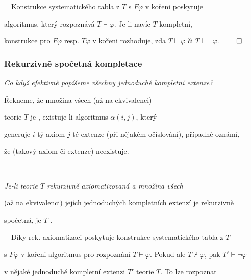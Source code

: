     {\it {}}\ \ Konstrukce systematického tabla z $T$ s $F\varphi$ v kořeni poskytuje
    \smallskip
    
    algoritmus, který rozpoznává $T\vdash\varphi$. Je-li navíc $T$ kompletní, 
    \smallskip
    
    konstrukce pro $F\varphi$ resp. $T\varphi$ v kořeni rozhoduje, zda $T \vdash \varphi$ či $T \vdash \neg\varphi$. $\qed$
    
    
    
    \subsubsection*{Rekurzivně spočetná kompletace}
    {\it Co když efektivně popíšeme všechny jednoduché kompletní extenze?}
    \medskip
    
    \smallskip
    
    Řekneme, že množina všech (až na ekvivalenci) 
    \smallskip
    
     teorie $T$ je , existuje-li algoritmus $\alpha(i,j)$, který
    \smallskip
    
    generuje $i$-tý axiom $j$-té extenze (při nějakém očíslování), případně oznámí,
    \smallskip
    
    že (takový axiom či extenze) neexistuje.
    \medskip
    
    \smallskip
    
    {\bf {}}\ \ {\it Je-li teorie $T$ rekurzivně axiomatizovaná a množina všech
    \smallskip
    
    (až na ekvivalenci) jejích jednoduchých kompletních extenzí je rekurzivně
    \smallskip
    
    spočetná, je $T$ .}
    \medskip
    
    \smallskip
    
    {\it {}}\ \ Díky rek. axiomatizaci poskytuje konstrukce systematického tabla z $T$
    \smallskip
    
    s $F\varphi$ v kořeni algoritmus pro rozpoznání $T\vdash \varphi$. Pokud ale $T \not \vdash \varphi$, pak $T'\vdash \neg\varphi$
    \smallskip
    
    v nějaké jednoduché kompletní extenzi $T'$ teorie $T$. To lze rozpoznat 
    \smallskip
    
